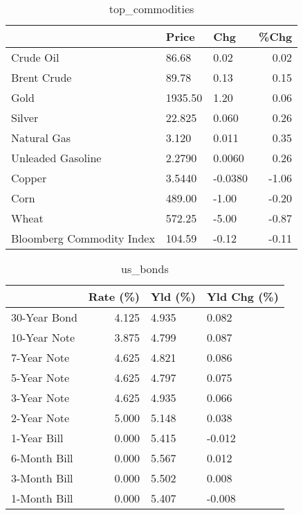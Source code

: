 \documentclass{article}%
\begin{document}
\begin{table}[htbp]%
\caption{top\_commodities}%
\centering%
\begin{adjustbox}{width=1\textwidth}%
\begin{tabular}{lllr}
\toprule
                          &   Price &     Chg &  \%Chg \\
\midrule
               Crude Oil  &   86.68 &    0.02 &  0.02 \\
             Brent Crude  &   89.78 &    0.13 &  0.15 \\
                    Gold  & 1935.50 &    1.20 &  0.06 \\
                  Silver  &  22.825 &   0.060 &  0.26 \\
             Natural Gas  &   3.120 &   0.011 &  0.35 \\
       Unleaded Gasoline  &  2.2790 &  0.0060 &  0.26 \\
                  Copper  &  3.5440 & -0.0380 & -1.06 \\
                    Corn  &  489.00 &   -1.00 & -0.20 \\
                   Wheat  &  572.25 &   -5.00 & -0.87 \\
Bloomberg Commodity Index &  104.59 &   -0.12 & -0.11 \\
\bottomrule
\end{tabular}
%
\end{adjustbox}%
\end{table}

%


\begin{table}[htbp]%
\caption{us\_bonds}%
\centering%
\begin{adjustbox}{width=1\textwidth}%
\begin{tabular}{lrll}
\toprule
             &  Rate (\%) & Yld (\%) & Yld Chg (\%) \\
\midrule
30-Year Bond &     4.125 &   4.935 &       0.082 \\
10-Year Note &     3.875 &   4.799 &       0.087 \\
 7-Year Note &     4.625 &   4.821 &       0.086 \\
 5-Year Note &     4.625 &   4.797 &       0.075 \\
 3-Year Note &     4.625 &   4.935 &       0.066 \\
 2-Year Note &     5.000 &   5.148 &       0.038 \\
 1-Year Bill &     0.000 &   5.415 &      -0.012 \\
6-Month Bill &     0.000 &   5.567 &       0.012 \\
3-Month Bill &     0.000 &   5.502 &       0.008 \\
1-Month Bill &     0.000 &   5.407 &      -0.008 \\
\bottomrule
\end{tabular}
%
\end{adjustbox}%
\end{table}
\end{document}
